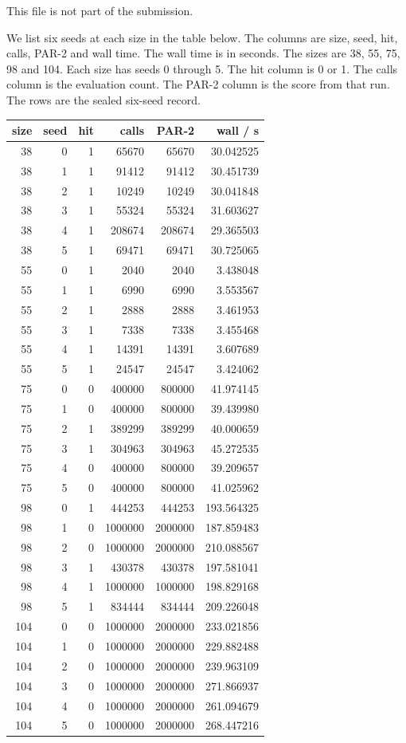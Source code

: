 \noindent This file is not part of the submission.

We list six seeds at each size in the table below.
The columns are size, seed, hit, calls, PAR-2 and wall time.
The wall time is in seconds.
The sizes are 38, 55, 75, 98 and 104.
Each size has seeds 0 through 5.
The hit column is 0 or 1.
The calls column is the evaluation count.
The PAR-2 column is the score from that run.
The rows are the sealed six-seed record.

\begin{tabular}{rrrrrr}
\toprule
size & seed & hit & calls & PAR-2 & wall / s \\
\midrule
38 & 0 & 1 & 65670 & 65670 & 30.042525 \\
38 & 1 & 1 & 91412 & 91412 & 30.451739 \\
38 & 2 & 1 & 10249 & 10249 & 30.041848 \\
38 & 3 & 1 & 55324 & 55324 & 31.603627 \\
38 & 4 & 1 & 208674 & 208674 & 29.365503 \\
38 & 5 & 1 & 69471 & 69471 & 30.725065 \\
55 & 0 & 1 & 2040 & 2040 & 3.438048 \\
55 & 1 & 1 & 6990 & 6990 & 3.553567 \\
55 & 2 & 1 & 2888 & 2888 & 3.461953 \\
55 & 3 & 1 & 7338 & 7338 & 3.455468 \\
55 & 4 & 1 & 14391 & 14391 & 3.607689 \\
55 & 5 & 1 & 24547 & 24547 & 3.424062 \\
75 & 0 & 0 & 400000 & 800000 & 41.974145 \\
75 & 1 & 0 & 400000 & 800000 & 39.439980 \\
75 & 2 & 1 & 389299 & 389299 & 40.000659 \\
75 & 3 & 1 & 304963 & 304963 & 45.272535 \\
75 & 4 & 0 & 400000 & 800000 & 39.209657 \\
75 & 5 & 0 & 400000 & 800000 & 41.025962 \\
98 & 0 & 1 & 444253 & 444253 & 193.564325 \\
98 & 1 & 0 & 1000000 & 2000000 & 187.859483 \\
98 & 2 & 0 & 1000000 & 2000000 & 210.088567 \\
98 & 3 & 1 & 430378 & 430378 & 197.581041 \\
98 & 4 & 1 & 1000000 & 1000000 & 198.829168 \\
98 & 5 & 1 & 834444 & 834444 & 209.226048 \\
104 & 0 & 0 & 1000000 & 2000000 & 233.021856 \\
104 & 1 & 0 & 1000000 & 2000000 & 229.882488 \\
104 & 2 & 0 & 1000000 & 2000000 & 239.963109 \\
104 & 3 & 0 & 1000000 & 2000000 & 271.866937 \\
104 & 4 & 0 & 1000000 & 2000000 & 261.094679 \\
104 & 5 & 0 & 1000000 & 2000000 & 268.447216 \\
\bottomrule
\end{tabular}
